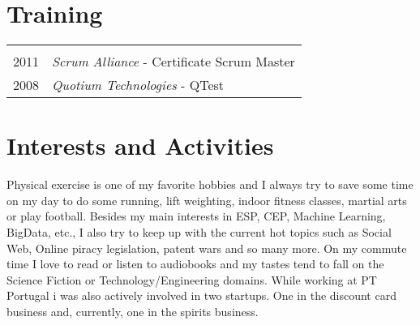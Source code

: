 \documentclass[a4paper,10pt]{article}
\begin{document}
\section{Training}
\begin{tabular}{rl}
\multicolumn{2}{c}{} \\
 2011 & \emph{Scrum Alliance} - Certificate Scrum Master  \\
 2008 & \emph{Quotium Technologies} - QTest \\
\end{tabular}

\section{Interests and Activities}
Physical exercise is one of my favorite hobbies and I always try to save some time on my day to do some running, lift weighting, indoor fitness classes, martial arts or play football.
Besides my main interests in ESP, CEP, Machine Learning, BigData, etc., I also try to keep up with the current hot topics such as Social Web, Online piracy legislation, patent wars and
so many more.
On my commute time I love to read or listen to audiobooks and my tastes tend to fall on the Science Fiction or Technology/Engineering domains.
While working at PT Portugal i was also actively involved in two startups. One in the discount card business and, currently, one in the spirits business.
\end{document}
